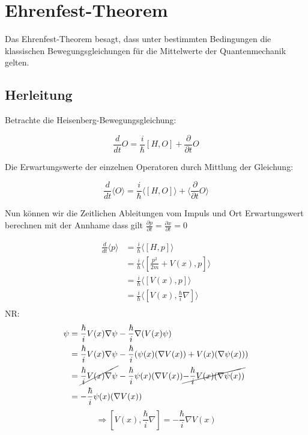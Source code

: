 



\section{Ehrenfest-Theorem}

Das Ehrenfest-Theorem besagt, dass unter bestimmten Bedingungen die klassischen Bewegungsgleichungen für die Mittelwerte der Quantenmechanik gelten.

\subsection{Herleitung}

Betrachte die Heisenberg-Bewegungsgleichung:

\[ \frac{d}{dt} O = \frac{i}{\hbar} [H,O] +\frac{\partial}{\partial t} O \]

Die Erwartungswerte der einzelnen Operatoren durch Mittlung der Gleichung:

\[ \frac{d}{dt} \langle O\rangle  = \frac{i}{\hbar} \langle [H,O]\rangle  + \langle  \frac{\partial}{\partial t}  O\rangle  \]

Nun können wir die Zeitlichen Ableitungen vom Impuls und Ort Erwartungswert berechnen mit der Annhame dass gilt \(\frac{\partial p}{\partial t} = \frac{\partial x}{\partial t} =  0 \)


\begin{align}
 \frac{d}{dt} \langle p \rangle  &= \frac{i}{\hbar} \langle [H,p]\rangle \\
&= \frac{i}{\hbar} \langle [\frac{p^2}{2m}+V(x),p]\rangle   \\
&= \frac{i}{\hbar} \langle [V(x),p]\rangle   \\
&= \frac{i}{\hbar} \langle [V(x),\frac{\hbar}{i}\nabla]\rangle   \\
\end{align}
NR:
 \begin{align}
[V(x),\frac{\hbar}{i}\nabla]\psi &=\frac{\hbar}{i} V(x)\nabla\psi - \frac{\hbar}{i}\nabla (V(x)\psi)\\
&= \frac{\hbar}{i} V(x)\nabla\psi -\frac{\hbar}{i}(\psi(x) (\nabla V(x)) + V(x) (\nabla\psi(x))  )  \\
&= \cancel{\frac{\hbar}{i} V(x)\nabla\psi} -\frac{\hbar}{i}\psi(x) (\nabla V(x))\cancel{ -\frac{\hbar}{i} V(x) (\nabla\psi(x))}   \\
&=-\frac{\hbar}{i}\psi(x) (\nabla V(x))
\end{align}
\[\Rightarrow [V(x),\frac{\hbar}{i}\nabla] = -\frac{\hbar}{i} \nabla V(x) \]


